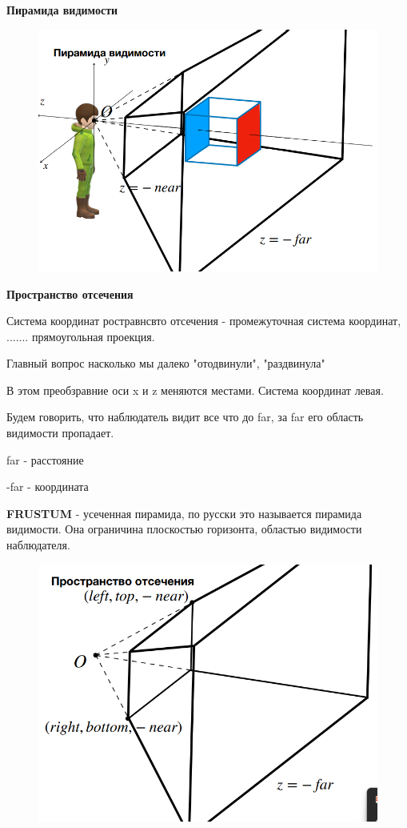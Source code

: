 \documentclass{article}
\begin{document}
\textbf{Пирамида видимости}

\begin{figure} [H]
    \includegraphics[width=0.70\linewidth]{Снимок экрана 2025-04-07 121910.png}
\end{figure}

\textbf{Пространство отсечения}

Система координат ростравнсвто отсечения - промежуточная система координат,
....... прямоугольная проекция.

Главный вопрос насколько мы далеко "отодвинули", "раздвинула"

В этом преобзравние оси x и z меняются местами. Система координат левая.

Будем говорить, что наблюдатель видит все что до far, за far его область
видимости пропадает.

far - расстояние

-far - координата

\textbf{FRUSTUM} - усеченная пирамида, по русски это называется пирамида видимости.
Она ограничина плоскостью горизонта, областью видимости наблюдателя.


\begin{figure} [H]
    \includegraphics[width=0.70\linewidth]{Снимок экрана 2025-04-07 122337.png}
\end{figure}
\end{document}
